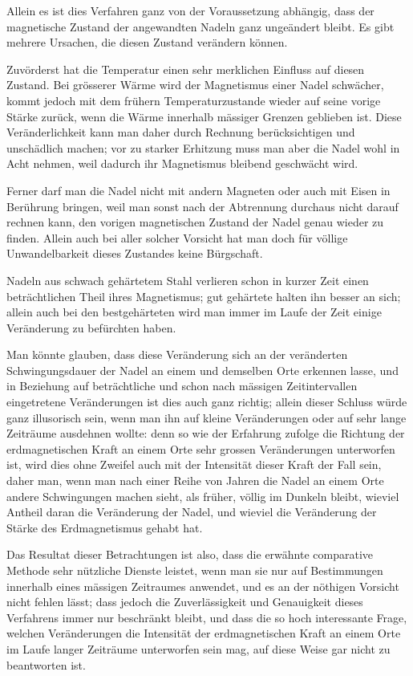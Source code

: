 \documentclass[12pt,a4paper]{article}
\begin{document}
Allein es ist dies Verfahren ganz von der Voraussetzung abhängig, dass der magnetische Zustand der angewandten Nadeln ganz ungeändert bleibt. Es gibt mehrere Ursachen, die diesen Zustand verändern können.

Zuvörderst hat die Temperatur einen sehr merklichen Einfluss auf diesen Zustand. Bei grösserer Wärme wird der Magnetismus einer Nadel schwächer, kommt jedoch mit dem frühern Temperaturzustande wieder auf seine vorige Stärke zurück, wenn die Wärme innerhalb mässiger Grenzen geblieben ist. Diese Veränderlichkeit kann man daher durch Rechnung berücksichtigen und unschädlich machen; vor zu starker Erhitzung muss man aber die Nadel wohl in Acht nehmen, weil dadurch ihr Magnetismus bleibend geschwächt wird.

Ferner darf man die Nadel nicht mit andern Magneten oder auch mit Eisen in Berührung bringen, weil man sonst nach der Abtrennung durchaus nicht darauf rechnen kann, den vorigen magnetischen Zustand der Nadel genau wieder zu finden. Allein auch bei aller solcher Vorsicht hat man doch für völlige Unwandelbarkeit dieses Zustandes keine Bürgschaft.

Nadeln aus schwach gehärtetem Stahl verlieren schon in kurzer Zeit einen beträchtlichen Theil ihres Magnetismus; gut gehärtete halten ihn besser an sich; allein auch bei den bestgehärteten wird man immer im Laufe der Zeit einige Veränderung zu befürchten haben.

Man könnte glauben, dass diese Veränderung sich an der veränderten Schwingungsdauer der Nadel an einem und demselben Orte erkennen lasse, und in Beziehung auf beträchtliche und schon nach mässigen Zeitintervallen eingetretene Veränderungen ist dies auch ganz richtig; allein dieser Schluss würde ganz illusorisch sein, wenn man ihn auf kleine Veränderungen oder auf sehr lange Zeiträume ausdehnen wollte: denn so wie der Erfahrung zufolge die Richtung der erdmagnetischen Kraft an einem Orte sehr grossen Veränderungen unterworfen ist, wird dies ohne Zweifel auch mit der Intensität dieser Kraft der Fall sein, daher man, wenn man nach einer Reihe von Jahren die Nadel an einem Orte andere Schwingungen machen sieht, als früher, völlig im Dunkeln bleibt, wieviel Antheil daran die Veränderung der Nadel, und wieviel die Veränderung der Stärke des Erdmagnetismus gehabt hat.

Das Resultat dieser Betrachtungen ist also, dass die erwähnte comparative Methode sehr nützliche Dienste leistet, wenn man sie nur auf Bestimmungen innerhalb eines mässigen Zeitraumes anwendet, und es an der nöthigen Vorsicht nicht fehlen lässt; dass jedoch die Zuverlässigkeit und Genauigkeit dieses Verfahrens immer nur beschränkt bleibt, und dass die so hoch interessante Frage, welchen Veränderungen die Intensität der erdmagnetischen Kraft an einem Orte im Laufe langer Zeiträume unterworfen sein mag, auf diese Weise gar nicht zu beantworten ist.
\end{document}
